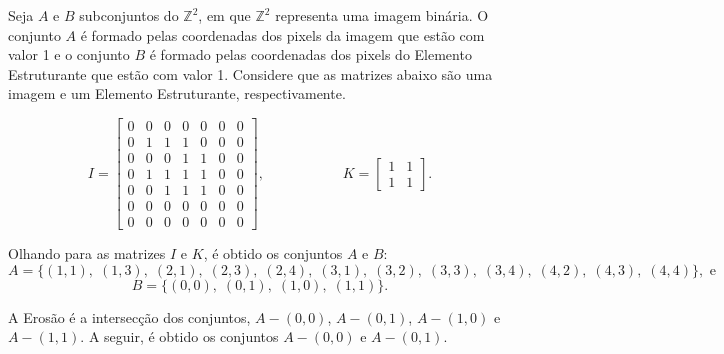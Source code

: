 \begin{exemplo}
	Seja $A$ e $B$ subconjuntos do $\mathbb{Z}^2$, em que $\mathbb{Z}^2$ representa uma imagem binária. O conjunto $A$ é formado pelas coordenadas dos pixels da imagem que estão com valor 1 e o conjunto $B$ é formado pelas coordenadas dos pixels do Elemento Estruturante que estão com valor 1. Considere que as matrizes abaixo são uma imagem e um Elemento Estruturante, respectivamente.
	
	\begin{equation}
		I = \begin{bmatrix}
			0 & 0 & 0 & 0 & 0 & 0 & 0 \\
			0 & 1 & 1 & 1 & 0 & 0 & 0 \\
			0 & 0 & 0 & 1 & 1 & 0 & 0 \\
			0 & 1 & 1 & 1 & 1 & 0 & 0 \\
			0 & 0 & 1 & 1 & 1 & 0 & 0 \\
			0 & 0 & 0 & 0 & 0 & 0 & 0 \\
			0 & 0 & 0 & 0 & 0 & 0 & 0
		\end{bmatrix},  \; \; \; \; \; \; \; \; \; \; \; \; \; \; \; \; \; \; \; \;
		K = \begin{bmatrix}
			1 & 1 \\
			1 & 1
		\end{bmatrix}.
	\end{equation}
	
	\noindent Olhando para as matrizes $I$ e $K$, é obtido os conjuntos $A$ e $B$:
	\begin{equation}
		A = \{(1,1), \; (1,3), \; (2,1), \; (2,3), \; (2,4), \; (3,1), \; (3,2), \; (3,3), \; (3,4), \; (4,2), \; (4,3), \; (4,4)\}, \text{ e }
	\end{equation} 
	\begin{equation}
		B = \{(0,0), \; (0,1), \; (1,0), \; (1,1)\}.
	\end{equation} 
	
	\noindent A Erosão é a intersecção dos conjuntos, $A - (0,0)$, $A - (0,1)$, $A - (1,0)$ e $A - (1,1)$. A seguir, é obtido os conjuntos $A - (0,0)$ e $A - (0,1)$.
	

\end{exemplo}
